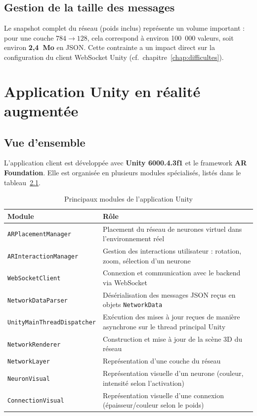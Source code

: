 \documentclass[12pt,a4paper]{report}
\begin{document}
\section{Gestion de la taille des messages}

Le snapshot complet du r\'eseau (poids inclus) repr\'esente un volume
important : pour une couche $784 \rightarrow 128$, cela correspond \`a
environ 100~000 valeurs, soit environ \textbf{2,4~Mo} en JSON. Cette
contrainte a un impact direct sur la configuration du client WebSocket
Unity (cf.~chapitre~\ref{chap:difficultes}).


\chapter{Application Unity en r\'ealit\'e augment\'ee}
\label{chap:unity}

\section{Vue d'ensemble}

L'application client est d\'evelopp\'ee avec \textbf{Unity 6000.4.3f1} et le
framework \textbf{AR Foundation}. Elle est organis\'ee en plusieurs modules
sp\'ecialis\'es, list\'es dans le tableau~\ref{tab:unity-scripts}.

\begin{table}[h!]
\centering
\begin{tabular}{lp{9.5cm}}
\toprule
\textbf{Module} & \textbf{R\^ole} \\
\midrule
\texttt{ARPlacementManager} & Placement du r\'eseau de neurones virtuel dans
l'environnement r\'eel \\
\texttt{ARInteractionManager} & Gestion des interactions utilisateur :
rotation, zoom, s\'election d'un neurone \\
\texttt{WebSocketClient} & Connexion et communication avec le backend via
WebSocket \\
\texttt{NetworkDataParser} & D\'es\'erialisation des messages JSON re\c{c}us
en objets \texttt{NetworkData} \\
\texttt{UnityMainThreadDispatcher} & Ex\'ecution des mises \`a jour re\c{c}ues
de mani\`ere asynchrone sur le thread principal Unity \\
\texttt{NetworkRenderer} & Construction et mise \`a jour de la sc\`ene 3D du
r\'eseau \\
\texttt{NetworkLayer} & Repr\'esentation d'une couche du r\'eseau \\
\texttt{NeuronVisual} & Repr\'esentation visuelle d'un neurone (couleur,
intensit\'e selon l'activation) \\
\texttt{ConnectionVisual} & Repr\'esentation visuelle d'une connexion
(\'epaisseur/couleur selon le poids) \\
\bottomrule
\end{tabular}
\caption{Principaux modules de l'application Unity}
\label{tab:unity-scripts}
\end{table}
\end{document}
